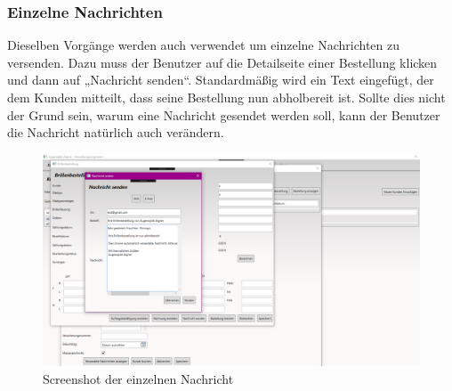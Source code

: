 \subsubsection{Einzelne Nachrichten}
Dieselben Vorgänge werden auch verwendet um einzelne Nachrichten zu versenden. Dazu muss der Benutzer auf die Detailseite einer Bestellung klicken und dann auf „Nachricht senden“. Standardmäßig wird ein Text eingefügt, der dem Kunden mitteilt, dass seine Bestellung nun abholbereit ist. Sollte dies nicht der Grund sein, warum eine Nachricht gesendet werden soll, kann der Benutzer die Nachricht natürlich auch verändern.
\begin{figure}[H]
\begin{center}
	\includegraphics[scale=.25]{images/EinzelneNachricht.png}
\end{center}
	\caption{Screenshot der einzelnen Nachricht}
	\label{fig:sample}
\end{figure}
